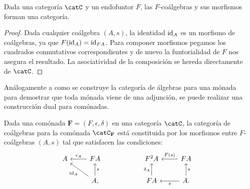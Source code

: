\begin{proposition}
  Dada una categoría $\catC$ y un endofuntor $F$, las $F$-coálgebras y sus morfismos forman una categoría.
\end{proposition}
\begin{proof}
  Dada cualquier coálgebra $(A,s)$, la identidad $\operatorname{id}_A$ es un morfismo de coálgebras, ya que
  $F(\operatorname{id}_A) = \operatorname{id}_{FA}$. Para componer morfismos pegamos los cuadrados conmutativos correspondientes 
  y de nuevo la funtorialidad de $F$ nos asegura el resultado. La asociatividad de la composición se 
  hereda directamente de $\catC$.
\end{proof}

Análogamente a como se construye la categoría de álgebras para una mónada para demostrar que toda mónada viene de una adjunción,
se puede realizar una construcción dual para comónadas.

\begin{definition}
  Dada una comónada $\textbf{F}=(F,\epsilon,\delta)$ en una categoría $\catC$, la categoría de coálgebras para la comónada $\catC_{\textbf{F}}$ 
  está constituida por los morfismos entre $F$-coálgebras $(A,s)$ tal que satisfacen las condiciones:
  \begin{equation*}
    \begin{tikzcd}
      A & FA\ar[swap]{l}{\epsilon_A} & {} & F^2A & FA\ar[swap]{l}{F(s)} \\
      {} & A,\ar{ul}{\id_A}\ar[swap]{u}{s} & {} & FA\ar{u}{\delta_A} & A.\ar{l}{s}\ar[swap]{u}{s}
    \end{tikzcd}
  \end{equation*}
\end{definition}

